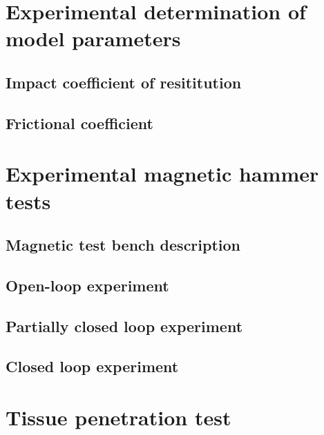 \documentclass[letterpaper, 10 pt, conference]{ieeeconf}  %
\begin{document}
\section{Experimental determination of model parameters}

\subsection{Impact coefficient of resititution}

\subsection{Frictional coefficient}

\section{Experimental magnetic hammer tests}

\subsection{Magnetic test bench description}

\subsection{Open-loop experiment}

\subsection{Partially closed loop experiment}

\subsection{Closed loop experiment}

\section{Tissue penetration test}
\end{document}
